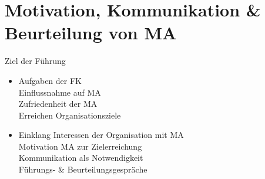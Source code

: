 \documentclass{cheatsheet}
\begin{document}
    \section{Motivation, Kommunikation \& Beurteilung von MA}
    \begin{sectionbox}{Ziel der Führung}
        \begin{itemize}
            \item Aufgaben der FK\\
            \ra Einflussnahme auf MA\\
            \ra Zufriedenheit der MA\\
            \ra Erreichen Organisationsziele
            \item Einklang Interessen der Organisation mit MA\\
            \ra Motivation MA zur Zielerreichung\\
            \ra Kommunikation als Notwendigkeit\\
            \ra Führungs- \& Beurteilungsgespräche
        \end{itemize}
    \end{sectionbox}
\end{document}

